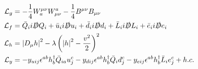\begin{align}
\mathcal{L_{\textrm{$g$}}} &= -\frac{1}{4} W^{\mu \nu}_{a} W^{a}_{\mu \nu} -\frac{1}{4} B^{\mu \nu} B_{\mu \nu}	\\
\mathcal{L_{\textrm{$f$}}} &= \bar{Q}_{i}i\slashed{D} Q_{i} + \bar{u}_{i}i\slashed{D} u_{i} + \bar{d}_{i}i\slashed{D} d_{i} + \bar{L}_{i}i\slashed{D} L_{i} + \bar{e}_{i}i\slashed{D} e_{i}	\\
\mathcal{L_{\textrm{$h$}}} &= \left| D_{\mu} h \right|^{2} - \lambda\left(\left|h \right|^{2} - \frac{v^{2}}{2} \right)^{2}	\\
\mathcal{L_{\textrm{$y$}}} &= -y_{u i j} \epsilon^{ab}h_{b}^{\dagger}\bar{Q}_{ia}u^{c}_{j} -y_{d i j} \epsilon^{ab}h_{b}^{\dagger}\bar{Q}_{i}d^{c}_{j} -y_{e i j} \epsilon^{ab}h_{b}^{\dagger}\bar{L}_{i}e^{c}_{j} + h.c.
\end{align}